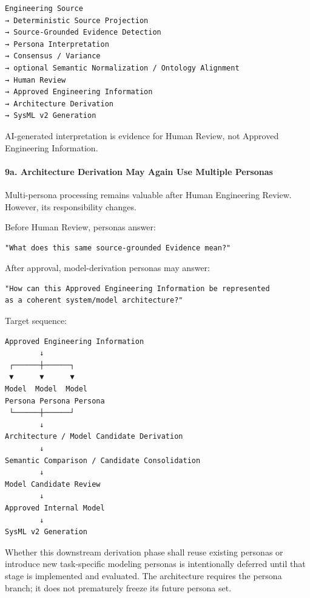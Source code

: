 \begin{verbatim}
Engineering Source
→ Deterministic Source Projection
→ Source-Grounded Evidence Detection
→ Persona Interpretation
→ Consensus / Variance
→ optional Semantic Normalization / Ontology Alignment
→ Human Review
→ Approved Engineering Information
→ Architecture Derivation
→ SysML v2 Generation
\end{verbatim}

AI-generated interpretation is evidence for Human Review, not Approved Engineering Information.

\hypertarget{9a-architecture-derivation-may-again-use-multiple-personas}{%
\paragraph{9a. Architecture Derivation May Again Use Multiple Personas}\label{9a-architecture-derivation-may-again-use-multiple-personas}}

Multi-persona processing remains valuable after Human Engineering Review. However, its responsibility changes.

Before Human Review, personas answer:

\begin{verbatim}
"What does this same source-grounded Evidence mean?"
\end{verbatim}

After approval, model-derivation personas may answer:

\begin{verbatim}
"How can this Approved Engineering Information be represented
as a coherent system/model architecture?"
\end{verbatim}

Target sequence:

\begin{verbatim}
Approved Engineering Information
        ↓
 ┌──────┼──────┐
 ▼      ▼      ▼
Model  Model  Model
Persona Persona Persona
 └──────┼──────┘
        ↓
Architecture / Model Candidate Derivation
        ↓
Semantic Comparison / Candidate Consolidation
        ↓
Model Candidate Review
        ↓
Approved Internal Model
        ↓
SysML v2 Generation
\end{verbatim}

Whether this downstream derivation phase shall reuse existing personas or introduce new task-specific modeling personas is intentionally deferred until that stage is implemented and evaluated. The architecture requires the persona branch; it does not prematurely freeze its future persona set.

